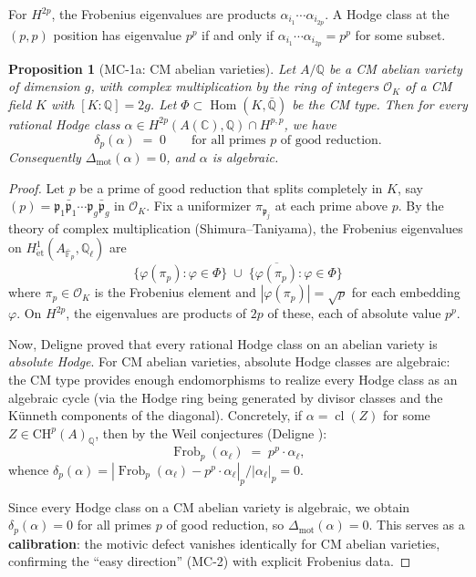 \documentclass[11pt]{article}
\newtheorem{proposition}[lemma]{Proposition}
\theoremstyle{definition}
\DeclareMathOperator{\Frob}{Frob}
\DeclareMathOperator{\cl}{cl}
\DeclareMathOperator{\Hom}{Hom}
\begin{document}
For $H^{2p}$, the Frobenius eigenvalues are products $\alpha_{i_1} \cdots \alpha_{i_{2p}}$.
A Hodge class at the $(p,p)$ position has eigenvalue $p^p$ if and only if
$\alpha_{i_1} \cdots \alpha_{i_{2p}} = p^p$ for some subset.

\begin{proposition}[MC-1a: CM abelian varieties]
\label{prop:MC-1a}
Let $A/\mathbb{Q}$ be a CM abelian variety of dimension $g$, with complex multiplication
by the ring of integers $\mathcal{O}_K$ of a CM field $K$ with $[K:\mathbb{Q}] = 2g$.
Let $\Phi \subset \Hom(K, \bar{\mathbb{Q}})$ be the CM type.
Then for every rational Hodge class $\alpha \in H^{2p}(A(\mathbb{C}), \mathbb{Q}) \cap H^{p,p}$,
we have
\[
  \delta_p(\alpha) \;=\; 0 \qquad \text{for all primes } p \text{ of good reduction.}
\]
Consequently $\Delta_{\mathrm{mot}}(\alpha) = 0$, and $\alpha$ is algebraic.
\end{proposition}

\begin{proof}
Let $p$ be a prime of good reduction that splits completely in $K$, say
$(p) = \mathfrak{p}_1 \bar{\mathfrak{p}}_1 \cdots \mathfrak{p}_g \bar{\mathfrak{p}}_g$
in $\mathcal{O}_K$.  Fix a uniformizer $\pi_{\mathfrak{p}_j}$ at each prime above $p$.
By the theory of complex multiplication (Shimura--Taniyama), the Frobenius eigenvalues
on $H^1_{\mathrm{\acute{e}t}}(A_{\bar{\mathbb{F}}_p}, \mathbb{Q}_\ell)$ are
\[
  \bigl\{ \varphi(\pi_p) : \varphi \in \Phi \bigr\}
  \;\cup\;
  \bigl\{ \overline{\varphi(\pi_p)} : \varphi \in \Phi \bigr\}
\]
where $\pi_p \in \mathcal{O}_K$ is the Frobenius element and $|\varphi(\pi_p)| = \sqrt{p}$
for each embedding $\varphi$.  On $H^{2p}$, the eigenvalues are products of $2p$ of
these, each of absolute value $p^p$.

Now, Deligne \cite{Deligne} proved that every rational Hodge class on an abelian variety
is \emph{absolute Hodge}.  For CM abelian varieties, absolute Hodge classes are algebraic:
the CM type provides enough endomorphisms to realize every Hodge class as an algebraic cycle
(via the Hodge ring being generated by divisor classes and the K\"unneth components
of the diagonal).  Concretely, if $\alpha = \cl(Z)$ for some $Z \in \mathrm{CH}^p(A)_{\mathbb{Q}}$,
then by the Weil conjectures (Deligne \cite{Deligne-Weil}):
\[
  \Frob_p(\alpha_\ell) \;=\; p^p \cdot \alpha_\ell,
\]
whence $\delta_p(\alpha) = |\Frob_p(\alpha_\ell) - p^p \cdot \alpha_\ell|_p / |\alpha_\ell|_p = 0$.

Since every Hodge class on a CM abelian variety is algebraic, we obtain $\delta_p(\alpha) = 0$
for all primes $p$ of good reduction, so $\Delta_{\mathrm{mot}}(\alpha) = 0$.
This serves as a \textbf{calibration}: the motivic defect vanishes identically
for CM abelian varieties, confirming the ``easy direction'' (MC-2) with explicit Frobenius data.
\end{proof}
\end{document}
